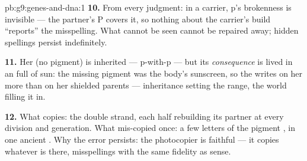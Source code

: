 \begin{solution}{pb:g9:genes-and-dna:1}
\textbf{10.} From every judgment: in a carrier, p's
brokenness is invisible --- the partner's P covers it, so
nothing about the carrier's build ``reports'' the
misspelling. What cannot be seen cannot be repaired
away; hidden spellings persist indefinitely.

\textbf{11.} Her  (no pigment) is inherited ---
p-with-p --- but its \emph{consequence} is lived in an
 full of sun: the missing pigment was the
body's sunscreen, so the  writes on her more
than on her shielded parents --- inheritance setting the
range, the world filling it in.

\textbf{12.} What copies: the double strand, each half
rebuilding its partner at every  division and
generation. What mis-copied once: a few letters of the
pigment , in one ancient . Why the error
persists: the photocopier is faithful --- it copies
whatever is there, misspellings with the same fidelity as
sense.
\end{solution}
